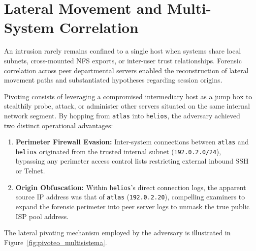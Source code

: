 \chapter{Lateral Movement and Multi-System Correlation}
\label{cap:correlacion_multisistema}

An intrusion rarely remains confined to a single host when systems share local subnets, cross-mounted NFS exports, or inter-user trust relationships. Forensic correlation across peer departmental servers enabled the reconstruction of lateral movement paths and substantiated hypotheses regarding session origins.

\begin{notaforense}
Pivoting consists of leveraging a compromised intermediary host as a jump box to stealthily probe, attack, or administer other servers situated on the same internal network segment. By hopping from \texttt{atlas} into \texttt{helios}, the adversary achieved two distinct operational advantages:
\begin{enumerate}
    \item \textbf{Perimeter Firewall Evasion:} Inter-system connections between \texttt{atlas} and \texttt{helios} originated from the trusted internal subnet (\texttt{192.0.2.0/24}), bypassing any perimeter access control lists restricting external inbound SSH or Telnet.
    \item \textbf{Origin Obfuscation:} Within \texttt{helios}'s direct connection logs, the apparent source IP address was that of \texttt{atlas} (\texttt{192.0.2.20}), compelling examiners to expand the forensic perimeter into peer server logs to unmask the true public ISP pool address.
\end{enumerate}
\end{notaforense}

The lateral pivoting mechanism employed by the adversary is illustrated in Figure~\ref{fig:pivoteo_multisistema}.

